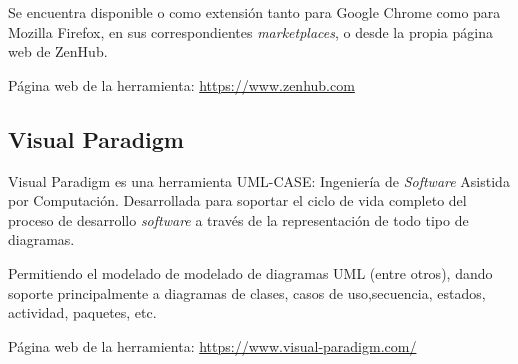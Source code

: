 Se encuentra disponible o como extensión tanto para Google Chrome como para Mozilla Firefox, en sus correspondientes \textit{marketplaces}, o desde la propia página web de ZenHub.

Página web de la herramienta: \url{https://www.zenhub.com}\\

\subsection{Visual Paradigm}
Visual Paradigm es una herramienta UML-CASE: Ingeniería de \textit{Software} Asistida por Computación. Desarrollada para soportar el ciclo de vida completo del proceso de desarrollo \textit{software} a través de la representación de todo tipo de diagramas.

Permitiendo el modelado de modelado de diagramas UML (entre otros), dando soporte principalmente a diagramas de clases, casos de uso,secuencia, estados, actividad, paquetes, etc.

Página web de la herramienta: \url{https://www.visual-paradigm.com/}